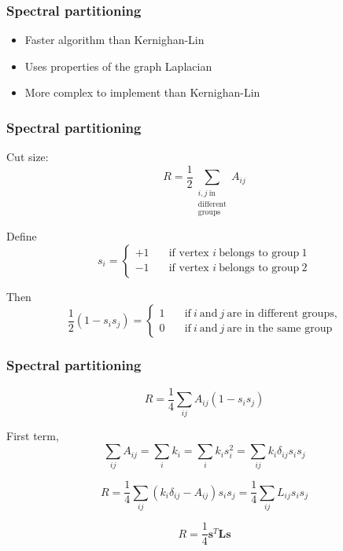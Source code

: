 \documentclass{beamer}
\begin{document}
\begin{frame}
    \frametitle{Spectral partitioning}
    \centering

    \begin{itemize}
        \setlength\itemsep{1em}
        \item{Faster algorithm than Kernighan-Lin}
        \item{Uses properties of the graph Laplacian}
        \item{More complex to implement than Kernighan-Lin}
    \end{itemize}
\end{frame}
\begin{frame}
    \frametitle{Spectral partitioning}
Cut size:
$$R = \frac{1}{2}\sum\limits_{\substack{i, j \ \text{in} \\ \text{different} \\ \text{groups}}}A_{ij}$$

Define
$$s_i = \begin{cases}+1 &\quad\text{if vertex } i\ \text{belongs to group} \ 1 \\-1 &\quad\text{if vertex } i\ \text{belongs to group} \ 2\end{cases}$$

Then
$$\frac{1}{2}(1-s_is_j) = \begin{cases}1 &\quad \text{if} \ i\ \text{and} \ j\ \text{are in different groups,}\\0 &\quad \text{if} \ i\ \text{and} \ j\ \text{are in the same group}\end{cases}$$
\end{frame}
\begin{frame}
    \frametitle{Spectral partitioning}
    $$R = \frac{1}{4}\sum\limits_{ij}A_{ij}(1-s_is_j)$$

First term,
$$\sum\limits_{ij}A_{ij} = \sum\limits_ik_i = \sum\limits_ik_is_i^2=\sum\limits_{ij}k_i\delta_{ij}s_is_j$$

$$R = \frac{1}{4}\sum\limits_{ij}(k_i\delta_{ij}-A_{ij})s_is_j = \frac{1}{4}\sum\limits_{ij}L_{ij}s_is_j$$

$$R = \frac{1}{4}{\mathbf s}^T{\mathbf L}{\mathbf s}$$
\end{frame}
\end{document}
